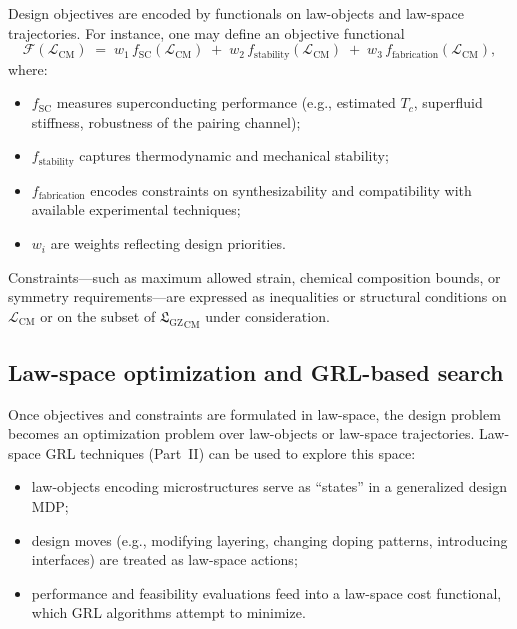 \documentclass[11pt]{book}
\newcommand{\GZLS}{\ensuremath{\mathfrak{L}_{\mathrm{GZ}}}}
\theoremstyle{plain}
\theoremstyle{definition}
\theoremstyle{remark}
\begin{document}
Design objectives are encoded by functionals on law-objects and
law-space trajectories. For instance, one may define an objective
functional
\[
   \mathcal{F}(\mathcal{L}_{\mathrm{CM}})
   \;=\;
   w_1 \, f_{\mathrm{SC}}(\mathcal{L}_{\mathrm{CM}})
   \;+\;
   w_2 \, f_{\mathrm{stability}}(\mathcal{L}_{\mathrm{CM}})
   \;+\;
   w_3 \, f_{\mathrm{fabrication}}(\mathcal{L}_{\mathrm{CM}}),
\]
where:
\begin{itemize}
  \item $f_{\mathrm{SC}}$ measures superconducting performance
        (e.g., estimated $T_c$, superfluid stiffness, robustness
        of the pairing channel);
  \item $f_{\mathrm{stability}}$ captures thermodynamic and
        mechanical stability;
  \item $f_{\mathrm{fabrication}}$ encodes constraints on
        synthesizability and compatibility with available
        experimental techniques;
  \item $w_i$ are weights reflecting design priorities.
\end{itemize}

Constraints—such as maximum allowed strain, chemical composition
bounds, or symmetry requirements—are expressed as inequalities or
structural conditions on $\mathcal{L}_{\mathrm{CM}}$ or on the
subset of ${\GZLS}_{\mathrm{CM}}$ under consideration.

\subsection*{Law-space optimization and GRL-based search}

Once objectives and constraints are formulated in law-space, the
design problem becomes an optimization problem over law-objects or
law-space trajectories. Law-space GRL techniques (Part~II) can be
used to explore this space:
\begin{itemize}
  \item law-objects encoding microstructures serve as ``states'' in
        a generalized design MDP;
  \item design moves (e.g., modifying layering, changing doping
        patterns, introducing interfaces) are treated as law-space
        actions;
  \item performance and feasibility evaluations feed into a
        law-space cost functional, which GRL algorithms attempt to
        minimize.
\end{itemize}
\end{document}
